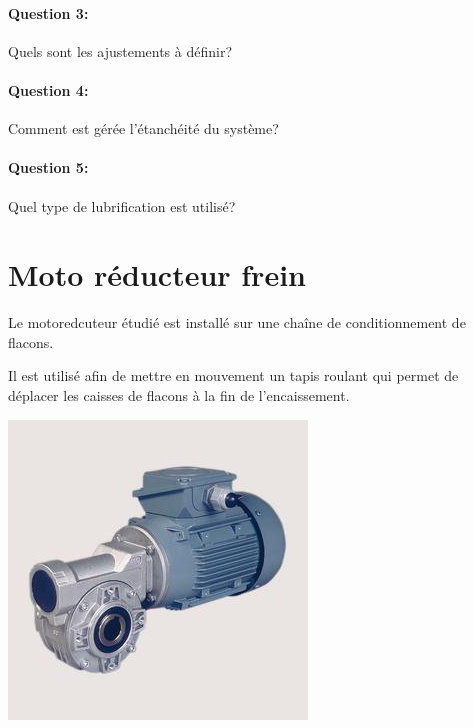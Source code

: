 \paragraph{Question 3:} Quels sont les ajustements à définir?

\paragraph{Question 4:} Comment est gérée l'étanchéité du système?

\paragraph{Question 5:} Quel type de lubrification est utilisé?





\newpage

\section{Moto réducteur frein}

\begin{minipage}{0.45\linewidth}

Le motoredcuteur étudié est installé sur une chaîne de conditionnement de flacons.

Il est utilisé afin de mettre en mouvement un tapis roulant qui permet de déplacer les caisses de flacons à la fin de l'encaissement.

\end{minipage}
\hfill
\begin{minipage}{0.45\linewidth}
 \centering\includegraphics[width=0.8\linewidth]{img/motoreducteur_frein.jpg}
\end{minipage}


